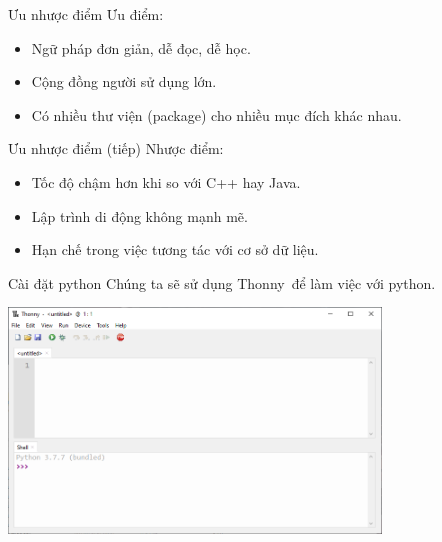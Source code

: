 \documentclass[11pt]{beamer}
\begin{document}
  \begin{frame}{Ưu nhược điểm}
    Ưu điểm:
    \begin{itemize}
      \item Ngữ pháp đơn giản, dễ đọc, dễ học.
      \item Cộng đồng người sử dụng lớn.
      \item Có nhiều thư viện (package) cho nhiều mục đích khác nhau.
    \end{itemize}
  \end{frame}

  \begin{frame}{Ưu nhược điểm (tiếp)}
    Nhược điểm:
    \begin{itemize}
      \item Tốc độ chậm hơn khi so với C++ hay Java.
      \item Lập trình di động không mạnh mẽ.
      \item Hạn chế trong việc tương tác với cơ sở dữ liệu.
    \end{itemize}
  \end{frame}

  \begin{frame}{Cài đặt python}
    Chúng ta sẽ sử dụng Thonny\footnotemark\ để làm việc với python.\\
    \begin{center}
      \includegraphics[height=6cm]{thonny.png}
    \end{center}
  \end{frame}
\end{document}
